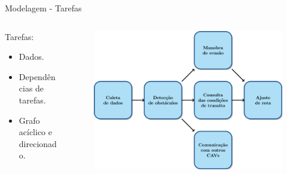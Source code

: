 \begin{frame}{Modelagem - Tarefas}
    \begin{columns}[T]
        \begin{column}{.5\textwidth}
            Tarefas:
            \begin{itemize}
                \item Dados.
                \item Dependências de tarefas.
                \item Grafo acíclico e direcionado.
            \end{itemize}
        \end{column}

        \begin{column}{.5\textwidth}
            \begin{figure}
                \centering
                \includegraphics[width=\textwidth]{Figuras/cav-task.png}
            \end{figure}
        \end{column}
    \end{columns}
\end{frame}

